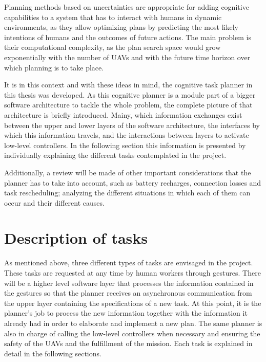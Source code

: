 Planning methods based on uncertainties are appropriate for adding cognitive capabilities to a system that has to interact with humans in dynamic environments, as they allow optimizing plans by predicting the most likely intentions of humans and the outcomes of future actions. The main problem is their computational complexity, as the plan search space would grow exponentially with the number of \glspl{UAV} and with the future time horizon over which planning is to take place.

It is in this context and with these ideas in mind, the cognitive task planner in this thesis was developed. As this cognitive planner is a module part of a bigger software architecture to tackle the whole problem, the complete picture of that architecture is briefly introduced. Mainy, which information exchanges exist between the upper and lower layers of the software architecture, the interfaces by which this information travels, and the interactions between layers to activate low-level controllers. In the following section this information is presented by individually explaining the different tasks contemplated in the project. 

Additionally, a review will be made of other important considerations that the planner has to take into account, such as battery recharges, connection losses and task rescheduling; analyzing the different situations in which each of them can occur and their different causes. 

\section{Description of tasks}
\label{sec:DescriptionOfTasks}
As mentioned above, three different types of tasks are envisaged in the project. These tasks are requested at any time by human workers through gestures. There will be a higher level software layer that processes the information contained in the gestures so that the planner receives an asynchronous communication from the upper layer containing the specifications of a new task. At this point, it is the planner's job to process the new information together with the information it already had in order to elaborate and implement a new plan. The same planner is also in charge of calling the low-level controllers when necessary and ensuring the safety of the \glspl{UAV} and the fulfillment of the mission. Each task is explained in detail in the following sections.

